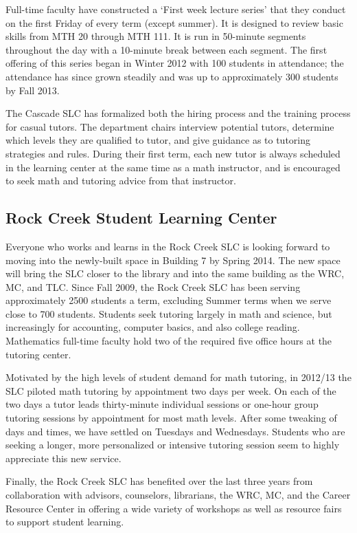 Full-time faculty have constructed a `First week lecture series' that they
conduct on the first Friday of every term (except summer). It is designed to
review basic skills from MTH 20 through MTH 111. It is run in 50-minute
segments throughout the day with a 10-minute break between each segment. The
first offering of this series began in Winter 2012 with 100 students in
attendance; the attendance has since  grown steadily and  was up to
approximately 300 students by Fall 2013. 

The Cascade SLC has formalized both the hiring process and the training process
for casual tutors. The department chairs interview potential tutors, determine 
which levels they are qualified to tutor, and give guidance as to tutoring 
strategies and rules. During their first term, each new tutor is always scheduled in the learning center at the same time as a math instructor, and is encouraged to seek math 
and tutoring advice from that instructor.

\subsection{Rock Creek Student Learning Center}
Everyone who works and learns in the Rock Creek SLC is looking forward to
moving into the newly-built space in Building 7 by Spring 2014. The new space
will bring the SLC closer to the library and into the same building as the WRC,
MC, and TLC.  Since Fall 2009, the Rock Creek SLC has been serving
approximately 2500 students a term, excluding Summer terms when we serve close
to 700 students.  Students seek tutoring largely in math and science, but
increasingly for accounting, computer basics, and also college reading.
Mathematics full-time faculty hold two of the required five office hours at the
tutoring center.

Motivated by the high levels of student demand for math tutoring, in 2012/13
the SLC piloted math tutoring by appointment two days per week. On each of the
two days a tutor leads thirty-minute individual sessions or one-hour group
tutoring sessions by appointment for most math levels.  After some tweaking of
days and times, we have settled on Tuesdays and Wednesdays.  Students who are
seeking a longer, more personalized or intensive tutoring session seem to
highly appreciate this new service.  

Finally, the Rock Creek SLC has benefited over the last three years from collaboration
with advisors, counselors, librarians, the WRC, MC, and the Career Resource
Center in offering a wide variety of workshops as well as resource fairs to
support student learning. 

